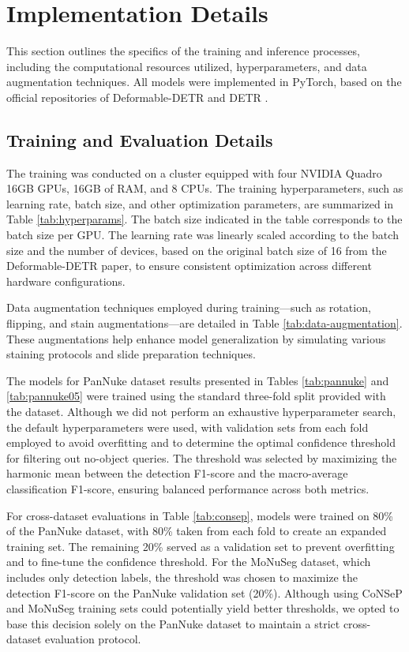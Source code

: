 \appendix

\section{Implementation Details}

This section outlines the specifics of the training and inference processes, including the computational resources utilized, hyperparameters, and data augmentation techniques. All models were implemented in PyTorch, based on the official repositories of Deformable-DETR \cite{zhu2020deformable} and DETR \cite{carion2020end}.

\subsection{Training and Evaluation Details}

The training was conducted on a cluster equipped with four NVIDIA Quadro 16GB GPUs, 16GB of RAM, and 8 CPUs. The training hyperparameters, such as learning rate, batch size, and other optimization parameters, are summarized in Table \ref{tab:hyperparams}. The batch size indicated in the table corresponds to the batch size per GPU. The learning rate was linearly scaled according to the batch size and the number of devices, based on the original batch size of 16 from the Deformable-DETR paper, to ensure consistent optimization across different hardware configurations.

Data augmentation techniques employed during training—such as rotation, flipping, and stain augmentations—are detailed in Table \ref{tab:data-augmentation}. These augmentations help enhance model generalization by simulating various staining protocols and slide preparation techniques.

The models for PanNuke dataset results presented in Tables \ref{tab:pannuke} and \ref{tab:pannuke05} were trained using the standard three-fold split provided with the dataset. Although we did not perform an exhaustive hyperparameter search, the default hyperparameters were used, with validation sets from each fold employed to avoid overfitting and to determine the optimal confidence threshold for filtering out no-object queries. The threshold was selected by maximizing the harmonic mean between the detection F1-score and the macro-average classification F1-score, ensuring balanced performance across both metrics.

For cross-dataset evaluations in Table \ref{tab:consep}, models were trained on 80\% of the PanNuke dataset, with 80\% taken from each fold to create an expanded training set. The remaining 20\% served as a validation set to prevent overfitting and to fine-tune the confidence threshold. For the MoNuSeg dataset, which includes only detection labels, the threshold was chosen to maximize the detection F1-score on the PanNuke validation set (20\%). Although using CoNSeP and MoNuSeg training sets could potentially yield better thresholds, we opted to base this decision solely on the PanNuke dataset to maintain a strict cross-dataset evaluation protocol.

